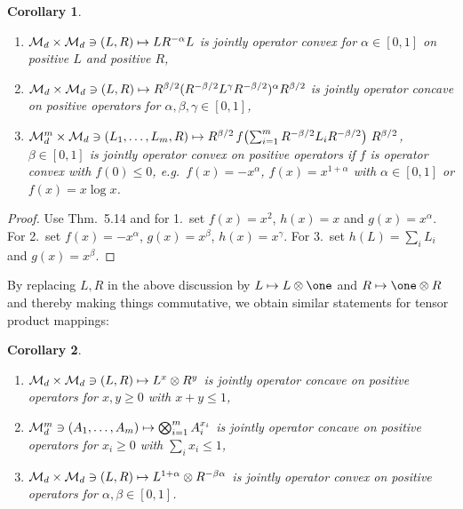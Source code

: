 \documentclass[11pt,a4paper]{article}
\theoremstyle{plain}
\newtheorem{corollary}{Corollary}[section]
\theoremstyle{definition}
\theoremstyle{remark}
\numberwithin{equation}{section}
\begin{document}
\begin{corollary}
    \begin{enumerate}
        \item $\mathcal{M}_d\times \mathcal{M}_d \ni (L,R)\mapsto L R^{-\alpha} L$ is jointly operator
              convex for $\alpha\in[0,1]$ on positive $L$ and positive $R$,
        \item $\mathcal{M}_d\times \mathcal{M}_d \ni (L,R)\mapsto
                  R^{\beta/2}(R^{-\beta/2} L^\gamma R^{-\beta/2})^\alpha R^{\beta/2}$
              is jointly operator concave on positive operators for $\alpha,\beta,\gamma\in[0,1]$,
        \item $\mathcal{M}_d^m \times \mathcal{M}_d \ni (L_1,\dots,L_m,R)\mapsto
                  R^{\beta/2}\, f\!\left(\sum_{i=1}^m R^{-\beta/2}L_i R^{-\beta/2}\right)\,R^{\beta/2}$,
              $\beta\in[0,1]$ is jointly operator convex on positive operators if $f$ is operator
              convex with $f(0)\le 0$, e.g.\ $f(x)=-x^\alpha$, $f(x)=x^{1+\alpha}$ with
              $\alpha\in[0,1]$ or $f(x)=x\log x$.
    \end{enumerate}
\end{corollary}

\begin{proof}
    Use Thm.~5.14 and for 1.\ set $f(x)=x^2$, $h(x)=x$ and $g(x)=x^\alpha$. For 2.\ set
    $f(x)=-x^\alpha$, $g(x)=x^\beta$, $h(x)=x^\gamma$. For 3.\ set $h(L)=\sum_i L_i$ and
    $g(x)=x^\beta$.
\end{proof}

By replacing $L,R$ in the above discussion by $L\mapsto L\otimes \one$ and
$R\mapsto \one\otimes R$ and thereby making things commutative, we obtain similar
statements for tensor product mappings:

\begin{corollary}
    \begin{enumerate}
        \item $\mathcal{M}_d\times \mathcal{M}_d \ni (L,R)\mapsto L^x\otimes R^y$ is jointly operator
              concave on positive operators for $x,y\ge 0$ with $x+y\le 1$,
        \item $\mathcal{M}_d^m \ni (A_1,\dots,A_m)\mapsto \bigotimes_{i=1}^m A_i^{x_i}$ is jointly
              operator concave on positive operators for $x_i\ge 0$ with $\sum_i x_i\le 1$,
        \item $\mathcal{M}_d\times \mathcal{M}_d \ni (L,R)\mapsto L^{1+\alpha}\otimes R^{-\beta\alpha}$ is
              jointly operator convex on positive operators for $\alpha,\beta\in[0,1]$.
    \end{enumerate}
\end{corollary}
\end{document}
